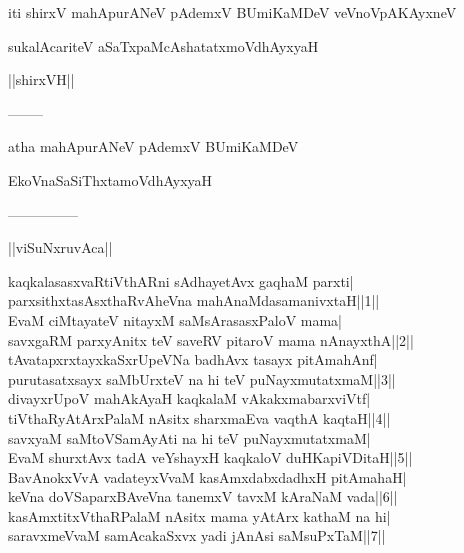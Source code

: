\documentclass{article}
\begin{document}
\begin{center}
iti shirxV mahApurANeV pAdemxV BUmiKaMDeV veVnoVpAKAyxneV
\end{center}

\begin{center}
sukalAcariteV aSaTxpaMcAshatatxmoVdhAyxyaH
\end{center}

\begin{center}
||shirxVH||
\end{center}

\begin{center}
--------
\end{center}

\begin{center}
atha mahApurANeV pAdemxV BUmiKaMDeV
\end{center}

\begin{center}
EkoVnaSaSiThxtamoVdhAyxyaH
\end{center}

\begin{center}

---------------
\end{center}

\begin{center}
||viSuNxruvAca||
\end{center}

kaqkalasasxvaRtiVthARni sAdhayetAvx gaqhaM parxti|\\
parxsithxtasAsxthaRvAheVna mahAnaMdasamanivxtaH||1||\\
EvaM ciMtayateV nitayxM saMsArasasxPaloV mama|\\
savxgaRM parxyAnitx teV saveRV pitaroV mama nAnayxthA||2||\\
tAvatapxrxtayxkaSxrUpeVNa badhAvx tasayx pitAmahAnf|\\
purutasatxsayx saMbUrxteV na hi teV puNayxmutatxmaM||3||\\
divayxrUpoV mahAkAyaH kaqkalaM vAkakxmabarxviVtf|\\
tiVthaRyAtArxPalaM nAsitx sharxmaEva vaqthA kaqtaH||4||\\
savxyaM saMtoVSamAyAti na hi teV puNayxmutatxmaM|\\
EvaM shurxtAvx tadA veYshayxH kaqkaloV duHKapiVDitaH||5||\\
BavAnokxVvA vadateyxVvaM kasAmxdabxdadhxH pitAmahaH|\\
keVna doVSaparxBAveVna tanemxV tavxM kAraNaM vada||6||\\
kasAmxtitxVthaRPalaM nAsitx mama yAtArx kathaM na hi|\\
saravxmeVvaM samAcakaSxvx yadi jAnAsi saMsuPxTaM||7||\\
\end{document}

